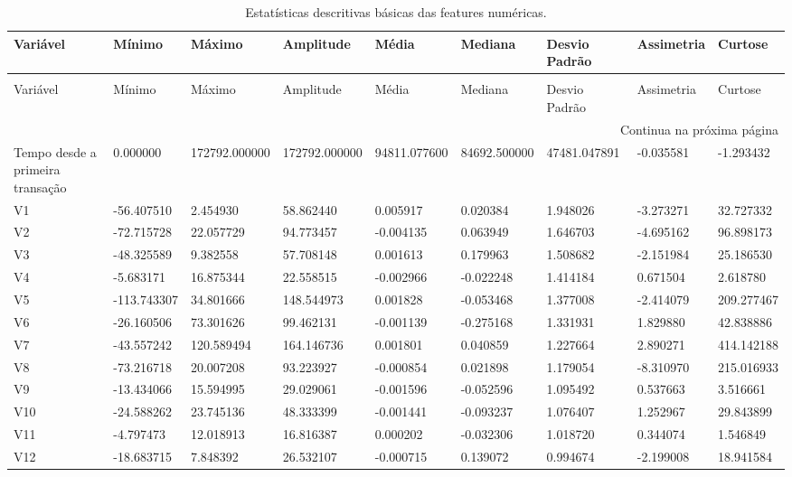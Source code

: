\begin{longtable}{lllllllll}
\caption{Estatísticas descritivas básicas das features numéricas.} \label{tab:estatisticas-basicas-features} \\
\toprule
Variável & Mínimo & Máximo & Amplitude & Média & Mediana & Desvio Padrão & Assimetria & Curtose \\
\midrule
\endfirsthead
\caption[]{Estatísticas descritivas básicas das features numéricas.} \\
\toprule
Variável & Mínimo & Máximo & Amplitude & Média & Mediana & Desvio Padrão & Assimetria & Curtose \\
\midrule
\endhead
\midrule
\multicolumn{9}{r}{Continua na próxima página} \\
\midrule
\endfoot
\bottomrule
\endlastfoot
Tempo desde a primeira transação & 0.000000 & 172792.000000 & 172792.000000 & 94811.077600 & 84692.500000 & 47481.047891 & -0.035581 & -1.293432 \\
V1 & -56.407510 & 2.454930 & 58.862440 & 0.005917 & 0.020384 & 1.948026 & -3.273271 & 32.727332 \\
V2 & -72.715728 & 22.057729 & 94.773457 & -0.004135 & 0.063949 & 1.646703 & -4.695162 & 96.898173 \\
V3 & -48.325589 & 9.382558 & 57.708148 & 0.001613 & 0.179963 & 1.508682 & -2.151984 & 25.186530 \\
V4 & -5.683171 & 16.875344 & 22.558515 & -0.002966 & -0.022248 & 1.414184 & 0.671504 & 2.618780 \\
V5 & -113.743307 & 34.801666 & 148.544973 & 0.001828 & -0.053468 & 1.377008 & -2.414079 & 209.277467 \\
V6 & -26.160506 & 73.301626 & 99.462131 & -0.001139 & -0.275168 & 1.331931 & 1.829880 & 42.838886 \\
V7 & -43.557242 & 120.589494 & 164.146736 & 0.001801 & 0.040859 & 1.227664 & 2.890271 & 414.142188 \\
V8 & -73.216718 & 20.007208 & 93.223927 & -0.000854 & 0.021898 & 1.179054 & -8.310970 & 215.016933 \\
V9 & -13.434066 & 15.594995 & 29.029061 & -0.001596 & -0.052596 & 1.095492 & 0.537663 & 3.516661 \\
V10 & -24.588262 & 23.745136 & 48.333399 & -0.001441 & -0.093237 & 1.076407 & 1.252967 & 29.843899 \\
V11 & -4.797473 & 12.018913 & 16.816387 & 0.000202 & -0.032306 & 1.018720 & 0.344074 & 1.546849 \\
V12 & -18.683715 & 7.848392 & 26.532107 & -0.000715 & 0.139072 & 0.994674 & -2.199008 & 18.941584 \\

\end{longtable}
